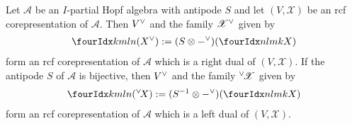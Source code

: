 \begin{Prop}
  Let $\mathscr{A}$ be an $I$-partial Hopf algebra with antipode $S$
  and  let $(V,\mathscr{X})$ be an rcf
  corepresentation of $\mathscr{A}$. Then $V^{\vee}$ and the family
  $\mathscr{X}^{\vee}$ given by
   \begin{align} \label{eq:rep-right-dual}
\Gr{(\dual{X})}{k}{l}{m}{n}   :=  (S \otimes \dual{-})(\Gr{X}{n}{m}{l}{k}) 
   \end{align} 
   form an rcf corepresentation of $\mathscr{A}$  which is a right dual of $(V,\mathscr{X})$. If the antipode
   $S$ of $\mathscr{A}$ is bijective, then $V^{\vee}$ and the family
   ${^{\vee}\!\mathscr{X}}$ given by 
   \begin{align} \label{eq:rep-left-dual}
 \Gr{(\predual{X})}{k}{l}{m}{n} :=(S^{-1}
   \otimes \dual{-})(\Gr{X}{n}{m}{l}{k})    
   \end{align}
 form an rcf corepresentation
 of $\mathscr{A}$ which is a
   left dual of $(V,\mathscr{X})$.
  \end{Prop}
